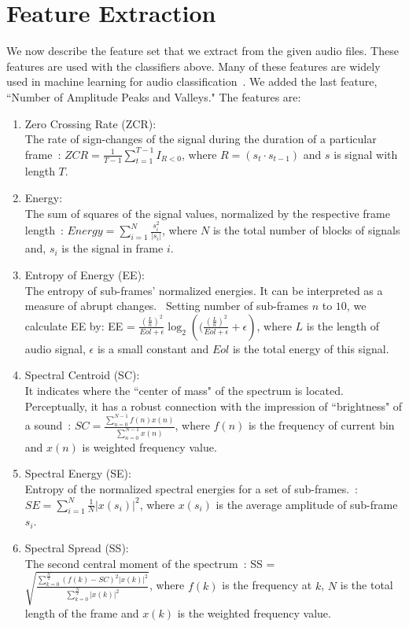 \section{Feature Extraction}
We now describe the feature set that we extract from the given audio files. These features are used with the classifiers above. Many of these features are widely used in machine learning for audio classification~\cite{b26,b27}. We added the last feature, ``Number of Amplitude Peaks and Valleys." The features are:
\begin{enumerate}
	\item Zero Crossing Rate (ZCR):\\
	The rate of sign-changes of the signal during the duration of a particular frame~\cite{b1}: $ZCR=\frac{1}{T-1}\sum_{t = 1}^{T - 1}I_{R<0}$, where $R = (s_t \cdot s_{t-1})$ and $s$ is signal with length $T$.
	\item Energy:\\
	The sum of squares of the signal values, normalized by the respective frame length~\cite{b2}: $Energy = \sum_{i = 1}^{N} \frac{s_i^2}{|s_i|} $, where $N$ is the total number of blocks of signals and, $s_i$ is the signal in frame $i$.
	\item Entropy of Energy (EE):\\
	The entropy of sub-frames' normalized energies. It can be interpreted as a measure of abrupt changes.~\cite{b2} Setting number of sub-frames $n$ to $10$, we calculate EE by: EE = $\frac{(\frac{L}{n})^2}{Eol +\epsilon} \log_{2}({(\frac{(\frac{L}{n})^2}{Eol +\epsilon} + \epsilon})$, where $L$ is the length of audio signal, $\epsilon$ is a small constant and $Eol$ is the total energy of this signal.
	\item Spectral Centroid (SC):\\
	It indicates where the ``center of mass" of the spectrum is located. Perceptually, it has a robust connection with the impression of ``brightness" of a sound~\cite{b3}:  $SC = \frac{\sum_{n = 0}^{N - 1} f(n)x(n)}{\sum_{n = 0}^{N - 1} x(n)}$, where $f(n)$ is the frequency of current bin and $x(n)$ is weighted frequency value.
	\item Spectral Energy (SE):\\
	Entropy of the normalized spectral energies for a set of sub-frames.~\cite{b3}: $SE = \sum_{i = 1}^{N} \frac{1}{N} |x(s_i)|^2$, where $x(s_i)$ is the average amplitude of sub-frame $s_i$.
	\item Spectral Spread (SS):\\
	The second central moment of the spectrum~\cite{b3}:  SS = $\sqrt{\frac{\sum_{k = 0}^{\frac{N}{2}} (f(k)-SC)^2 |x(k)|^2}{\sum_{k = 0}^{\frac{N}{2}} |x(k)|^2 }}$, where $f(k)$ is the frequency at $k$, $N$ is the total length of the frame and $x(k)$ is the weighted frequency value.

\end{enumerate}
